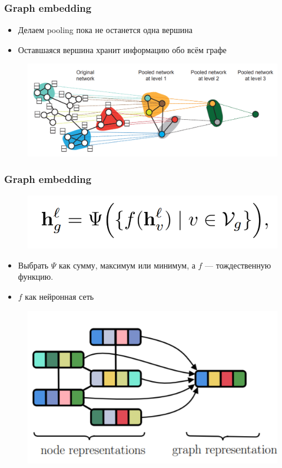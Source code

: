 \documentclass{beamer}
\begin{document}
\begin{frame}
\frametitle{Graph embedding}
\begin{itemize}
	\item Делаем pooling пока не останется одна вершина
	\item Оставшаяся вершина хранит информацию обо всём графе
\end{itemize}
\begin{figure}
	\includegraphics[width=\columnwidth]{pooled_network.png}
\end{figure}
\end{frame}

\begin{frame}
\frametitle{Graph embedding}
\begin{multicols}{2}
\begin{figure}
	\includegraphics[width=\columnwidth]{graph_classification.png}
\end{figure}
\begin{itemize}
	\item Выбрать $\Psi$ как сумму, максимум или минимум, а $f$ --- тождественную функцию.
	\item $f$ как нейронная сеть
\end{itemize}
\columnbreak
\begin{figure}
	\includegraphics[width=\columnwidth]{graph_aggregation.png}
\end{figure}
	
\end{multicols}
\end{frame}
\end{document}
